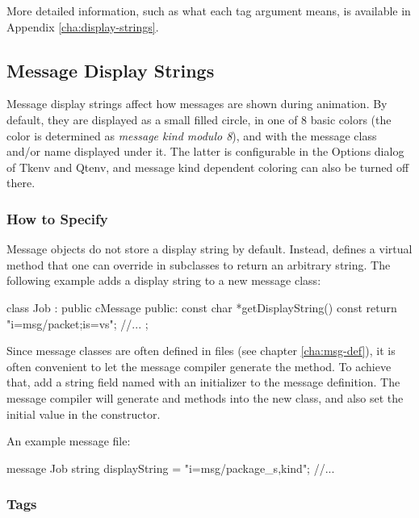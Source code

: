 More detailed information, such as what each tag argument means, is
available in Appendix \ref{cha:display-strings}.


\subsection{Message Display Strings}
\label{sec:graphics:message-displaystrings}

Message display strings affect how messages are shown during animation.
By default, they are displayed as a small filled circle, in one of
8 basic colors (the color is determined as \textit{message kind modulo 8}),
and with the message class and/or name displayed under it.
The latter is configurable in the Options dialog of Tkenv and Qtenv,
and message kind dependent coloring can also be turned off there.

\subsubsection{How to Specify}
\label{sec:graphics:specifying-message-displaystrings}

Message objects do not store a display string by default. Instead,
 defines a virtual  method
that one can override in subclasses to return an arbitrary string.
The following example adds a display string to a new message class:

\begin{cpp}
class Job : public cMessage
{
  public:
    const char *getDisplayString() const {return "i=msg/packet;is=vs";}
    //...
};
\end{cpp}

Since message classes are often defined in  files (see chapter
\ref{cha:msg-def}), it is often convenient to let the message compiler
generate the  method. To achieve that, add a
string field named  with an initializer to the message
definition. The message compiler will generate 
and  methods into the new class, and also set the
initial value in the constructor.

An example message file:

\begin{msg}
message Job
{
    string displayString = "i=msg/package_s,kind";
    //...
}
\end{msg}

\subsubsection{Tags}
\label{sec:graphics:message-displaystring-tags}

